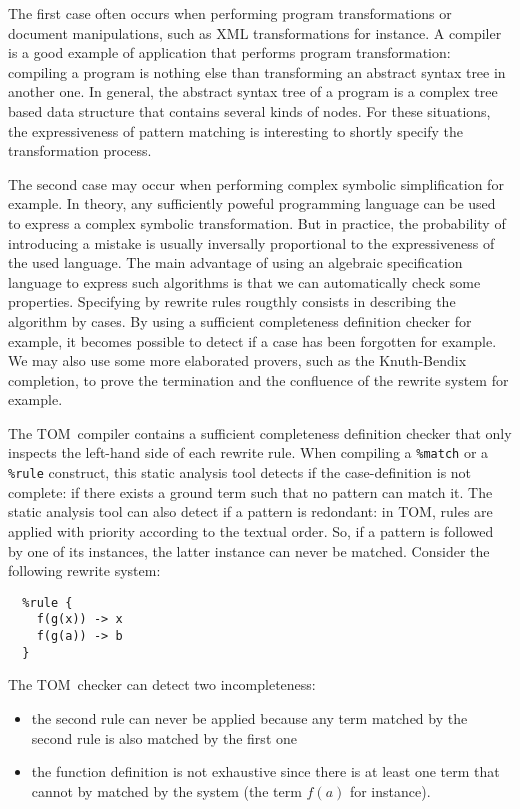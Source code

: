 \documentclass[a4paper]{article}
\newcommand{\TOM}{\textsf{TOM}}
\begin{document}
The first case often occurs when performing program transformations or
document manipulations, such as XML transformations for instance.
A compiler is a good example of application that performs program
transformation: compiling a program is nothing else than transforming
an abstract syntax tree in another one.   
In general, the abstract syntax tree of a program is a complex tree
based data structure that contains several kinds of nodes.
For these situations, the expressiveness of pattern matching is
interesting to shortly specify the transformation process.

The second case may occur when performing complex symbolic simplification
for example. 
In theory, any sufficiently poweful programming language can be used
to express a complex symbolic transformation. But in practice, 
the probability of introducing a mistake is usually inversally
proportional to the expressiveness of the used language.
The main advantage of using an algebraic specification language to
express such algorithms is that we can automatically check some
properties.
Specifying by rewrite rules rougthly consists in describing the
algorithm by cases. By using a sufficient completeness definition
checker for example, it becomes possible to detect if a case has been
forgotten for example. 
We may also use some more elaborated provers, such as the Knuth-Bendix completion, to
prove the termination and the confluence of the rewrite system for
example.

The \TOM\ compiler contains a sufficient completeness definition
checker that only inspects the left-hand side of each rewrite rule.
When compiling a \texttt{\%match} or a \texttt{\%rule} construct, this
static analysis tool detects if the case-definition is not complete:
if there exists a ground term such that no pattern can match it.
The static analysis tool can also detect if a pattern is
redondant: in \TOM, rules are applied with priority according to the
textual order. So, if a pattern is followed by one of its instances,
the latter instance can never be matched. 
Consider the following rewrite system:
\begin{verbatim}
  %rule {
    f(g(x)) -> x
    f(g(a)) -> b
  }
\end{verbatim}

The \TOM\ checker can detect two incompleteness:
\begin{itemize}
\item the second rule can never be applied because any term matched by
  the second rule is also matched by the first one
\item the function definition is not exhaustive since there is at least
  one term that cannot by matched by the system (the term $f(a)$ for
  instance). 
\end{itemize}
\end{document}
